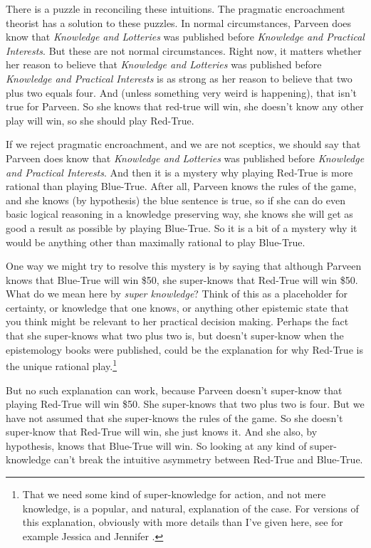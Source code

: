 \documentclass{article}
\begin{document}
There is a puzzle in reconciling these intuitions. The pragmatic encroachment theorist has a solution to these puzzles. In normal circumstances, Parveen does know that \emph{Knowledge and Lotteries} was published before \emph{Knowledge and Practical Interests}. But these are not normal circumstances. Right now, it matters whether her reason to believe that \emph{Knowledge and Lotteries} was published before \emph{Knowledge and Practical Interests} is as strong as her reason to believe that two plus two equals four. And (unless something very weird is happening), that isn't true for Parveen. So she knows that red-true will win, she doesn't know any other play will win, so she should play Red-True.

If we reject pragmatic encroachment, and we are not sceptics, we should say that Parveen does know that \emph{Knowledge and Lotteries} was published before \emph{Knowledge and Practical Interests}. And then it is a mystery why playing Red-True is more rational than playing Blue-True. After all, Parveen knows the rules of the game, and she knows (by hypothesis) the blue sentence is true, so if she can do even basic logical reasoning in a knowledge preserving way, she knows she will get as good a result as possible by playing Blue-True. So it is a bit of a mystery why it would be anything other than maximally rational to play Blue-True.

One way we might try to resolve this mystery is by saying that although Parveen knows that Blue-True will win \$50, she super-knows that Red-True will win \$50. What do we mean here by \emph{super knowledge}? Think of this as a placeholder for certainty, or knowledge that one knows, or anything other epistemic state that you think might be relevant to her practical decision making. Perhaps the fact that she super-knows what two plus two is, but doesn't super-know when the epistemology books were published, could be the explanation for why Red-True is the unique rational play.\footnote{That we need some kind of super-knowledge for action, and not mere knowledge, is a popular, and natural, explanation of the case. For versions of this explanation, obviously with more details than I've given here, see for example Jessica \citet{Brown2008} and Jennifer \citet{Lackey2010}.}

But no such explanation can work, because Parveen doesn't super-know that playing Red-True will win \$50. She super-knows that two plus two is four. But we have not assumed that she super-knows the rules of the game. So she doesn't super-know that Red-True will win, she just knows it. And she also, by hypothesis, knows that Blue-True will win. So looking at any kind of super-knowledge can't break the intuitive asymmetry between Red-True and Blue-True.
\end{document}
